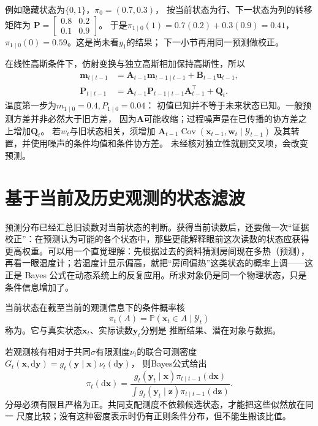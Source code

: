 例如隐藏状态为$\{0,1\}$，$\pi_0=(0.7,0.3)$，
按当前状态为行、下一状态为列的转移矩阵为
$\bm P=\left[\begin{smallmatrix}0.8&0.2\\0.1&0.9\end{smallmatrix}\right]$。
于是$\pi_{1\mid0}(1)=0.7(0.2)+0.3(0.9)=0.41$，
$\pi_{1\mid0}(0)=0.59$。这是尚未看$y_1$的结果；
下一小节再用同一预测做校正。

在线性高斯条件下，仿射变换与独立高斯相加保持高斯性，所以
\begin{align}
 \bm m_{t\mid t-1}
   &=\bm A_{t-1}\bm m_{t-1\mid t-1}+\bm B_{t-1}\bm u_{t-1},
       \label{eq:dynamical-kalman-predicted-mean}\\
 \bm P_{t\mid t-1}
   &=\bm A_{t-1}\bm P_{t-1\mid t-1}\bm A_{t-1}^\top+\bm Q_t.
       \label{eq:dynamical-kalman-predicted-covariance}
\end{align}
温度第一步为$m_{1\mid0}=0.4,P_{1\mid0}=0.04$：
初值已知并不等于未来状态已知。一般预测方差并非必然大于旧方差，
因为$\bm A$可能收缩；过程噪声是在已传播的协方差之上增加$\bm Q_t$。
若$w_t$与旧状态相关，须增加
$\bm A_{t-1}\operatorname{Cov}(\bm x_{t-1},\bm w_t\mid\mathcal Y_{t-1})$
及其转置，并使用噪声的条件均值和条件协方差。
未经核对独立性就删交叉项，会改变预测。

\section{基于当前及历史观测的状态滤波}
预测分布已经汇总旧读数对当前状态的判断。获得当前读数后，还要做一次“证据校正”：在预测认为可能的各个状态中，那些更能解释眼前这次读数的状态应获得更高权重。可以用一个直觉理解：先根据过去的资料猜测房间现在多热（预测），再看一眼温度计；若温度计显示偏高，就把“房间偏热”这类状态的概率上调——这正是 Bayes 公式在动态系统上的反复应用。所求对象仍是同一个物理状态，只是条件信息增加了。

\begin{definition}[滤波分布]
 \label{def:dynamical-filtering-distribution}
 当前状态在截至当前的观测信息下的条件概率核
 \begin{equation}
  \pi_t(A)=\mathbb P(\bm x_t\in A\mid\mathcal Y_t)
   \label{eq:dynamical-filtering-distribution}
 \end{equation}
 称为。它与真实状态$\bm x_t$、实际读数$\bm y_t$分别是
 推断结果、潜在对象与数据。
\end{definition}

若观测核有相对于共同$\sigma$有限测度$\nu_t$的联合可测密度
$G_t(\bm x,\mathrm d\bm y)=g_t(\bm y\mid\bm x)\nu_t(\mathrm d\bm y)$，
则Bayes公式给出
\begin{equation}
 \pi_t(\mathrm d\bm x)=
 \frac{g_t(\bm y_t\mid\bm x)\pi_{t\mid t-1}(\mathrm d\bm x)}
      {\int g_t(\bm y_t\mid\bm z)\pi_{t\mid t-1}(\mathrm d\bm z)}.
 \label{eq:dynamical-general-bayes-filter}
\end{equation}
分母必须有限且严格为正。共同支配测度不依赖候选状态，才能把这些似然放在同一
尺度比较；没有这种密度表示时仍有正则条件分布，但不能生搬该比值。

